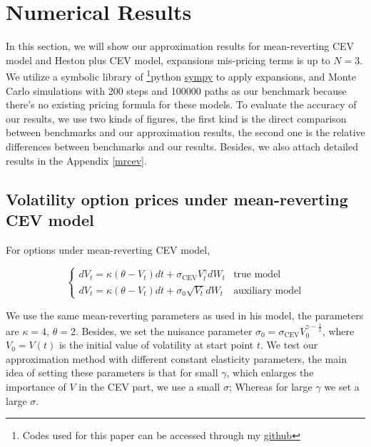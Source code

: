 \chapter{Numerical Results}

In this section, we will show our approximation results for mean-reverting CEV model and Heston plus CEV model, expansions mis-pricing terms is up to $N=3$. We utilize a symbolic library of \footnote{Codes used for this paper can be accessed through my \href{https://github.com/ywang408/master-thesis-code}{github}}{python} \href{https://www.sympy.org/en/index.html}{sympy} to apply expansions, and Monte Carlo simulations with 200 steps and 100000 paths as our benchmark because there's no existing pricing formula for these models. To evaluate the accuracy of our results, we use two kinds of figures, the first kind is the direct comparison between benchmarks and our approximation results, the second one is the relative differences between benchmarks and our results. Besides, we also attach detailed results in the Appendix \ref{mrcev}.

\section{Volatility option prices under mean-reverting CEV model}

For options under mean-reverting CEV model,

$$
  \begin{cases}
    d V_t=\kappa(\theta - V_t) d t+\sigma_{\text{CEV}} V^{\gamma}_t d W_t &\text{true model}\\
    d V_t=\kappa(\theta - V_t) d t+\sigma_0 \sqrt{V_t} d W_t &\text{auxiliary model}
  \end{cases}
$$

We use the same mean-reverting parameters as \cite{grunbichler_valuing_1996} used in his model, the parameters are $\kappa=4$, $\theta=2$. Besides, we set the nuisance parameter $\sigma_0 = \sigma_{\text{CEV}} V_0^{\gamma-\frac{1}{2}}$, where $V_0=V(t)$ is the initial value of volatility at start point $t$. We test our approximation method with different constant elasticity parameters, the main idea of setting these parameters is that for small $\gamma$, which enlarges the importance of $V$ in the CEV part, we use a small $\sigma$; Whereas for large $\gamma$ we set a large $\sigma$. 

